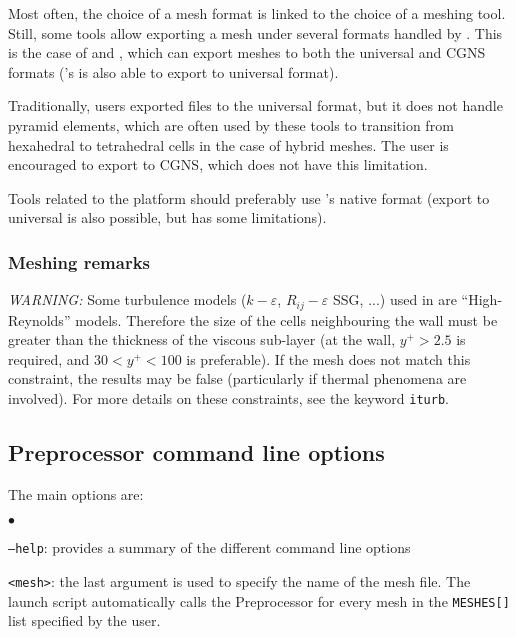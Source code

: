 {{{{Most often, the choice of a mesh format is linked to the choice of
a meshing tool. Still, some tools allow exporting a mesh under several
formats handled by \CS. This is the case of \fluent and \icemcfd,
which can export meshes to both the \ideas universal and CGNS formats
(\fluent's \gambit is also able to export to \ideas universal format).

Traditionally, users exported files to the \ideas universal format,
but it does not handle pyramid elements, which are often used by these
tools to transition from hexahedral to tetrahedral cells in the case
of hybrid meshes. The user is encouraged to export to CGNS, which
does not have this limitation.

Tools related to the \salome platform should preferably use
\salome{}'s native \med format (export to \ideas universal is
also possible, but has some limitations).

\subsubsection{Meshing remarks}
\label{sec:prg_meshes}%

{\em WARNING: }
Some turbulence models ($k-\varepsilon$, $R_{ij}-\varepsilon$ SSG, ...) used in
\CS are ``High-Reynolds'' models. Therefore the size of the cells
neighbouring the wall must be greater than the thickness of the viscous
sub-layer (at the wall, $y^+>2.5$ is required, and $30<y^+<100$ is
preferable). If the mesh does not match this constraint, the results may
be false (particularly if thermal phenomena are involved). For more details
on these constraints, see the keyword \texttt{iturb}.

\subsection{Preprocessor command line options}
\label{sec:prg_optappelecs}%
The main options are:
\begin{list}{$\bullet$}{}
\item \texttt{--help}: provides a summary of the different command line options

\item \texttt{<mesh>}: the last argument is used to specify the name of the mesh file.
The launch script automatically calls the Preprocessor for every
mesh in the \texttt{MESHES[]} list specified by the user.


\end{list}}}}}
